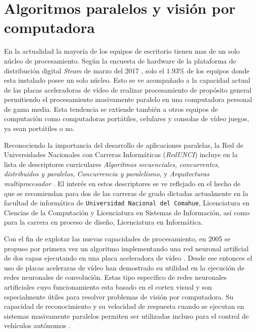 
\section{Algoritmos paralelos y visión por computadora}

En la actualidad la mayoría de los equipos de escritorio tienen mas de un solo
núcleo de procesamiento. Según la encuesta de hardware de la plataforma de
distribución digital \emph{Steam} de marzo del 2017 \cite{steamSurvey}, solo
el $1.93$\% de los equipos donde esta instalado posee un solo núcleo. Esto se
ve acompañado a la capacidad actual de las placas aceleradoras de vídeo de
realizar procesamiento de propósito general permitiendo el procesamiento
masivamente paralelo en una computadora personal de gama media. Esta tendencia
se extiende también a otros equipos de computación como computadoras
portátiles, celulares y consolas de vídeo juegos, ya sean portátiles o no.

Reconociendo la importancia del desarrollo de aplicaciones paralelas, la Red
de Universidades Nacionales con Carreras Informáticas (\emph{RedUNCI}) incluye
en la lista de descriptores curriculares \emph{Algoritmos secuenciales,
concurrentes, distribuidos y paralelos}, \emph{Concurrencia y paralelismo}, y
\emph{Arquitecturas multiprocesador} \cite{RedUNCI2015}. El interés en estos
descriptores se ve reflejado en el hecho de que se recomiendan para dos de las
carreras de grado dictadas actualmente en la facultad de informática de
\texttt{Universidad Nacional del Comahue}, Licenciatura en Ciencias de la
Computación y Licenciatura en Sistemas de Información, así como para la
carrera en proceso de diseño, Licenciatura en Informática.

Con el fin de explotar las nuevas capacidades de procesamiento, en 2005 se
propuso por primera vez un algoritmo implementando una red neuronal artificial
de dos capas ejecutando en una placa aceleradora de vídeo \cite{GPUforMLA}.
Desde ese entonces el uso de placas aceleraras de vídeo han demostrado su
utilidad en la ejecución de redes neuronales de convolución. Estas tipo
especifico de redes neuronales artificiales cuyo funcionamiento esta basado en
el cortex visual y son especialmente útiles para resolver problemas de visión
por computadora. Su capacidad de reconocimiento y su velocidad de respuesta
cuando se ejecutan en sistemas masivamente paralelos permiten ser utilizadas
incluso para el control de vehículos autónomos \cite{e2eLearning4SDC}.


